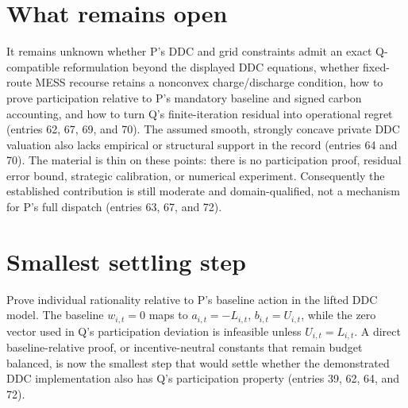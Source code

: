 \documentclass{article}
\begin{document}
\section*{What remains open}
It remains unknown whether P's DDC and grid constraints admit an exact
Q-compatible reformulation beyond the displayed DDC equations, whether
fixed-route MESS recourse retains a nonconvex charge/discharge condition, how
to prove participation relative to P's mandatory baseline and signed carbon
accounting, and how to turn Q's finite-iteration residual into operational
regret (entries 62, 67, 69, and 70).  The assumed smooth, strongly concave
private DDC valuation also lacks empirical or structural support in the
record (entries 64 and 70).  The material is thin on these points: there is no
participation proof, residual error bound, strategic calibration, or numerical
experiment.  Consequently the established contribution is still moderate
and domain-qualified, not a mechanism for P's full dispatch (entries 63, 67,
and 72).

\section*{Smallest settling step}
Prove individual rationality relative to P's baseline action in the lifted
DDC model.  The baseline \(w_{i,t}=0\) maps to
\(a_{i,t}=-L_{i,t}\), \(b_{i,t}=U_{i,t}\), while the zero vector used in Q's
participation deviation is infeasible unless \(U_{i,t}=L_{i,t}\).  A direct
baseline-relative proof, or incentive-neutral constants that remain budget
balanced, is now the smallest step that would settle whether the demonstrated
DDC implementation also has Q's participation property (entries 39, 62, 64,
and 72).
\end{document}
